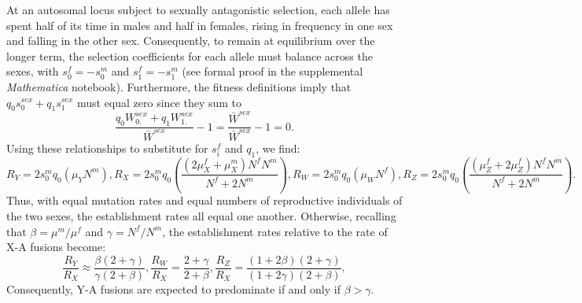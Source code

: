 \documentclass[12pt,twoside]{article}
\begin{document}
At an autosomal locus subject to sexually antagonistic selection, each allele has spent half of its time in males and half in females, rising in frequency in one sex and falling in the other sex. Consequently, to remain at equilibrium over the longer term, the selection coefficients for each allele must balance across the sexes, with $s^f_0 = -s^m_0$ and $s^f_\text{1} = -s^m_\text{1}$ (see formal proof in the supplemental \emph{Mathematica} notebook). Furthermore, the fitness definitions imply that $q_0s^{sex}_0 + q_\text{1}s^{sex}_\text{1}$ must equal zero since they sum to
\[\frac{q_0W^{sex}_{0.} + q_\text{1}W^{sex}_{\text{1}.}}{\bar{W}^{sex}} - \text{1} = \frac{\bar{W}^{sex}}{\bar{W}^{sex}} - \text{1} = 0.\]
Using these relationships to substitute for $s^f_i$ and $q_\text{1}$, we find:
\begin{subequations}
\begin{equation}
R_Y = \text{2}s^m_0 q_0 (\mu_YN^m),
\end{equation}
\begin{equation}
R_X = \text{2}s^m_0 q_0 \left(\frac{(\text{2}\mu^f_X + \mu^m_X)N^fN^m}{N^f + \text{2}N^m} \right),
\end{equation}
\begin{equation}
R_W = \text{2}s^m_0 q_0 (\mu_WN^f),
\end{equation}
\begin{equation}
R_Z = \text{2}s^m_0 q_0 \left(\frac{(\mu^f_Z + \text{2}\mu^f_Z)N^fN^m}{N^f + \text{2}N^m} \right).
\end{equation}
\end{subequations}
Thus, with equal mutation rates and equal numbers of reproductive individuals of the two sexes, the establishment rates all equal one another. Otherwise, recalling that $\beta = \mu^m/\mu^f$ and $\gamma = N^f / N^m$, the establishment rates relative to the rate of X-A fusions become:
\begin{subequations}
\begin{equation}
\frac{R_Y}{R_X} \approx \frac{\beta(\text{2} + \gamma)}{\gamma(\text{2} + \beta)},
\end{equation}
\begin{equation}
\frac{R_W}{R_X} = \frac{\text{2} + \gamma}{\text{2} + \beta},
\end{equation}
\begin{equation}
\frac{R_Z}{R_X} = \frac{(\text{1} + \text{2}\beta)(\text{2} + \gamma)}{(\text{1} + \text{2}\gamma)(\text{2} + \beta)},
\end{equation}
\end{subequations}
Consequently, Y-A fusions are expected to predominate if and only if $\beta > \gamma$.
\end{document}
